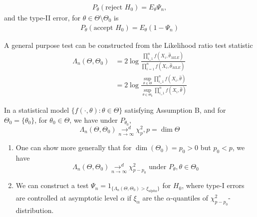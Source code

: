 \documentclass[a4paper]{article}
\begin{document}
\begin{align*}
	P_{\theta}(\text{reject } H_0) = E_{\theta} \Psi_n
,\end{align*}
and the type-II error, for $\theta \in \Theta\setminus\Theta_0$ is
\begin{align*}
	P_{\theta}(\text{accept } H_0) = E_{\theta}(1-\Psi_n)
\end{align*}

\begin{defn}
A general purpose test can be constructed from the Likelihood ratio test statistic
\begin{align*}
	\Lambda_n(\Theta,\Theta_0) &= 2\log \frac{\prod_{i_=1}^{n} f(X_i, \hat{\theta}_{MLE})}{\prod_{i=1}^{n}f(X_i, \hat{\theta}_{MLE})} \\
	&= 2\log \frac{\sup_{\theta \in \Theta} \prod_{i_=1}^{n} f(X_i, \hat{\theta})}{\sup_{\theta \in \Theta_0} \prod_{i_=1}^{n} f(X_i, \hat{\theta})}
\end{align*}
\end{defn}

\begin{thm}[Wilks']
	In a statistical model $\{f\left( \cdot , \theta \right) : \theta \in \Theta \}$ satisfying Assumption B, and for $\Theta_0 = \{\theta_0\} $, for $\theta_0 \in \Theta$, we have under $P_{\theta_0}$,
	\[
		\Lambda_{n}(\Theta, \Theta_0) \underset{n\to \infty}{\to ^{d}} \chi^2_{p},p = \dim\Theta
	\] 
	
\end{thm}

\begin{remark}
	\begin{enumerate}
		\item One can show more generally that for $\dim(\Theta_0) = p_0 > 0$ but $p_0 < p$, we have
	\[
		\Lambda_{n}(\Theta, \Theta_0) \underset{n\to \infty}{\to ^{d}} \chi^2_{p-p_0} \text{ under  } P_{\theta}, \theta \in \Theta_0
	\]
\item We can construct a test $\Psi_{n} = 1_{\{ \Lambda_n (\Theta, \Theta_0) > \xi_{alpha}\} }$ for $H_0$, where type-I errors are controlled at asymptotic level $\alpha$ if $\xi_{\alpha}$ are the $\alpha$-quantiles of  $\chi^2_{p-p_0}$-distribution.
	\end{enumerate}
\end{remark}
\end{document}
